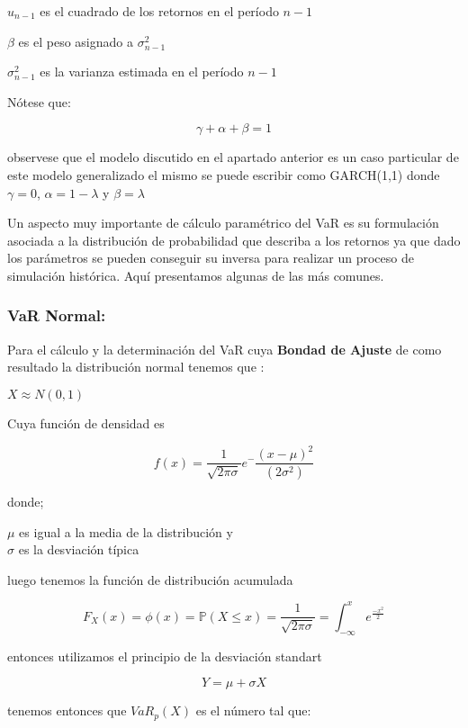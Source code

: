 \documentclass[]{article}
\begin{document}
\(u_{n-1}\) es el cuadrado de los retornos en el período \(n-1\)

\(\beta\) es el peso asignado a \(\sigma_{n-1}^2\)

\(\sigma_{n-1}^2\) es la varianza estimada en el período \(n-1\)

Nótese que:

\[\gamma + \alpha + \beta = 1\]

observese que el modelo discutido en el apartado anterior es un caso
particular de este modelo generalizado el mismo se puede escribir como
GARCH(1,1) donde \(\gamma=0\), \(\alpha= 1 - \lambda\) y
\(\beta = \lambda\)

Un aspecto muy importante de cálculo paramétrico del VaR es su
formulación asociada a la distribución de probabilidad que describa a
los retornos ya que dado los parámetros se pueden conseguir su inversa
para realizar un proceso de simulación histórica. Aquí presentamos
algunas de las más comunes.

\hypertarget{var-normal}{%
\subsubsection{\texorpdfstring{\textbf{VaR
Normal:}}{VaR Normal:}}\label{var-normal}}

Para el cálculo y la determinación del VaR cuya \textbf{Bondad de
Ajuste} de como resultado la distribución normal tenemos que :

\(X \approx N(0,1)\)

Cuya función de densidad es

\[f(x) = \frac{1}{\sqrt{2 \pi \sigma}} e^-\frac{(x - \mu)^2}{(2 \sigma^2)}\]

donde;

\(\mu\) es igual a la media de la distribución y\\
\(\sigma\) es la desviación típica

luego tenemos la función de distribución acumulada

\[F_{X}(x) = \phi(x) = \mathbb{P}(X \leq x) = \frac{1}{\sqrt{2 \pi \sigma}} = \int_{-\infty}^{x}e^{\frac{-x^2}{2}}\]

entonces utilizamos el principio de la desviación standart

\[Y = \mu + \sigma X\]

tenemos entonces que \(VaR_{p}(X)\) es el número tal que:
\end{document}
